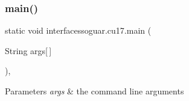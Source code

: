 \subsubsection{\texorpdfstring{main()}{main()}}
{\footnotesize\ttfamily static void interfacessoguar.\+cu17.\+main (\begin{DoxyParamCaption}\item[{String}]{args\mbox{[}$\,$\mbox{]} }\end{DoxyParamCaption})\hspace{0.3cm}{\ttfamily [inline]}, {\ttfamily [static]}}


\begin{DoxyParams}{Parameters}
{\em args} & the command line arguments \\
\hline
\end{DoxyParams}

